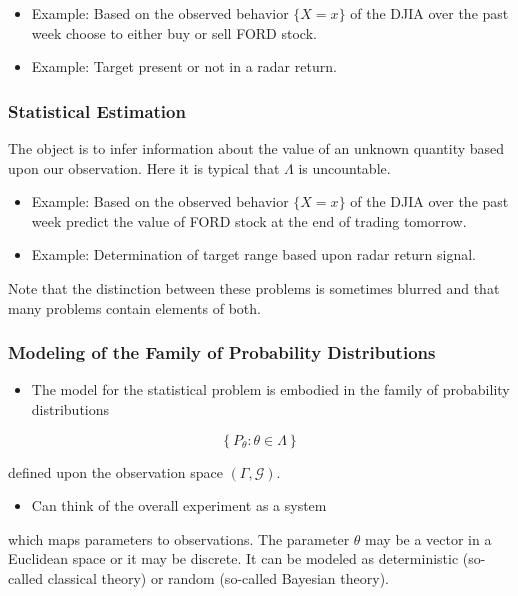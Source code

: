\documentclass[12pt,thmsa]{article}
\begin{document}
\begin{itemize}
	\item Example: Based on the observed behavior $\{X=x\}$ of the DJIA over the past week choose to either buy or sell FORD stock.
	\item Example: Target present or not in a radar return.
\end{itemize}

\subsubsection{Statistical Estimation}
The object is to infer information about the value of an unknown quantity based upon our observation. Here it is typical that $\Lambda$ is uncountable.

\begin{itemize}
	\item Example: Based on the observed behavior $\{X=x\}$ of the DJIA over the past week predict the value of FORD stock at the end of trading tomorrow.
	\item Example: Determination of target range based upon radar return signal.
\end{itemize}

Note that the distinction between these problems is sometimes blurred and that many problems contain elements of both.

\subsubsection{Modeling of the Family of Probability Distributions}
\begin{itemize}
	\item The model for the statistical problem is embodied in the family of probability distributions
\end{itemize}

$$
\left\{P_{\theta}: \theta \in \Lambda\right\}
$$

defined upon the observation space $(\Gamma, \mathcal{G})$.

\begin{itemize}
	\item Can think of the overall experiment as a system
\end{itemize}



which maps parameters to observations. The parameter $\theta$ may be a vector in a Euclidean space or it may be discrete. It can be modeled as deterministic (so-called classical theory) or random (so-called Bayesian theory).
\end{document}
